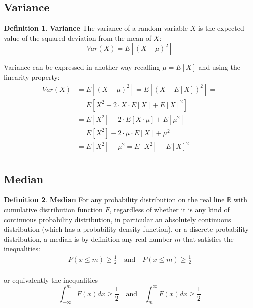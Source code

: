 \documentclass[12pt, letterpaper]{article}
\theoremstyle{definition}
\newtheorem{definition}{Definition}[section]
\newcommand{\R}{\mathbb{R}}
\begin{document}
\subsection{Variance}
\label{Variance}
\begin{definition}{\textbf{Variance}}
The variance of a random variable $X$ is the expected value of the squared deviation from the mean of $X$:
\begin{equation}
Var\left( X\right) = E\left[ \left( X - \mu \right)^2\right] 
\end{equation}

Variance can be expressed in another way recalling $\mu = E\left[ X\right]$ and using the linearity property:
\begin{equation}
\begin{aligned}
	Var\left( X\right) &= E\left[ \left( X - \mu \right)^2\right] = E\left[ \left( X - E\left[ X\right] \right)^2\right] =\\
	&= E\left[ X^2 - 2\cdot X \cdot E\left[ X\right] + E\left[ X\right] ^2\right]\\
	&= E\left[ X^2\right] - 2\cdot E\left[X \cdot \mu \right]+ E\left[\mu^2\right]\\
	&= E\left[ X^2\right] - 2\cdot \mu \cdot E\left[X\right]+\mu^2 \\
	&= E\left[ X^2\right] - \mu^2 = E\left[ X^2\right] - E\left[ X\right] ^2 \\
\end{aligned}
\end{equation}

\end{definition}

\subsection{Median}
\begin{definition}{\textbf{Median}}
For any probability distribution on the real line $\R$ with cumulative distribution function $F$, regardless of whether it is any kind of continuous probability distribution, in particular an absolutely continuous distribution (which has a probability density function), or a discrete probability distribution, a median is by definition any real number $m$ that satisfies the inequalities:
\begin{align}
P(x\le m) \ge \frac{1}{2} \quad \text{and} \quad P(x\le m) \ge \frac{1}{2}\\
\end{align}

or equivalently the inequalities
\begin{equation}
\int_{- \infty}^{m} F(x) dx \ge  \frac{1}{2} \quad \text{and} \quad \int_{m}^{\infty} F(x) dx \ge  \frac{1}{2} 
\end{equation}
\end{definition}
\end{document}
